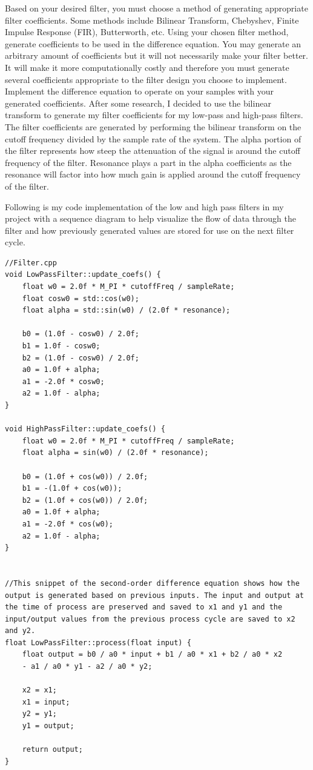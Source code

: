 \documentclass[acmlarge,screen]{acmart}
\begin{document}
Based on your desired filter, you must choose a method of generating appropriate filter coefficients. Some methods include Bilinear Transform, Chebyshev, Finite Impulse Response (FIR), Butterworth, etc.
Using your chosen filter method, generate coefficients to be used in the difference equation. You may generate an arbitrary amount of coefficients but it will not necessarily make your filter better. It will make it more computationally costly and therefore you must generate several coefficients appropriate to the filter design you choose to implement.
Implement the difference equation to operate on your samples with your generated coefficients.
After some research, I decided to use the bilinear transform to generate my filter coefficients for my low-pass and high-pass filters. The filter coefficients are generated by performing the bilinear transform on the cutoff frequency divided by the sample rate of the system. The alpha portion of the filter represents how steep the attenuation of the signal is around the cutoff frequency of the filter. Resonance plays a part in the alpha coefficients as the resonance will factor into how much gain is applied around the cutoff frequency of the filter.

Following is my code implementation of the low and high pass filters in my project with a sequence diagram to help visualize the flow of data through the filter and how previously generated values are stored for use on the next filter cycle.

\begin{lstlisting}
//Filter.cpp
void LowPassFilter::update_coefs() {
	float w0 = 2.0f * M_PI * cutoffFreq / sampleRate;
	float cosw0 = std::cos(w0);
	float alpha = std::sin(w0) / (2.0f * resonance);
	
	b0 = (1.0f - cosw0) / 2.0f;
	b1 = 1.0f - cosw0;
	b2 = (1.0f - cosw0) / 2.0f;
	a0 = 1.0f + alpha;
	a1 = -2.0f * cosw0;
	a2 = 1.0f - alpha;
}

void HighPassFilter::update_coefs() {
	float w0 = 2.0f * M_PI * cutoffFreq / sampleRate;
	float alpha = sin(w0) / (2.0f * resonance);
	
	b0 = (1.0f + cos(w0)) / 2.0f;
	b1 = -(1.0f + cos(w0));
	b2 = (1.0f + cos(w0)) / 2.0f;
	a0 = 1.0f + alpha;
	a1 = -2.0f * cos(w0);
	a2 = 1.0f - alpha;
}


//This snippet of the second-order difference equation shows how the output is generated based on previous inputs. The input and output at the time of process are preserved and saved to x1 and y1 and the input/output values from the previous process cycle are saved to x2 and y2.
float LowPassFilter::process(float input) {
	float output = b0 / a0 * input + b1 / a0 * x1 + b2 / a0 * x2
	- a1 / a0 * y1 - a2 / a0 * y2;
	
	x2 = x1;
	x1 = input;
	y2 = y1;
	y1 = output;
	
	return output;
}
\end{lstlisting}
\end{document}
